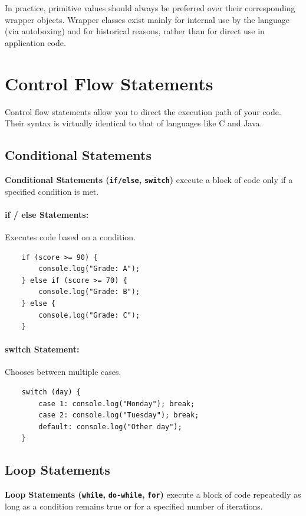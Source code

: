 \documentclass{scrbook}
\begin{document}
In practice, primitive values should always be preferred over their corresponding wrapper objects. Wrapper classes exist mainly for internal use by the language (via autoboxing) and for historical reasons, rather than for direct use in application code.

\section{Control Flow Statements}

Control flow statements allow you to direct the execution path of your code. Their syntax is virtually identical to that of languages like C and Java.

\subsection{Conditional Statements}

\textbf{Conditional Statements (}\texttt{\textbf{if/else}}\textbf{, } \texttt{\textbf{switch}}\textbf{)} execute a block of code only if a specified condition is met.

\paragraph{if / else Statements:} Executes code based on a condition.

\begin{lstlisting}
    if (score >= 90) {
        console.log("Grade: A");
    } else if (score >= 70) {
        console.log("Grade: B");
    } else {
        console.log("Grade: C");
    }
\end{lstlisting}

\paragraph{switch Statement:} Chooses between multiple cases.

\begin{lstlisting}
    switch (day) {
        case 1: console.log("Monday"); break;
        case 2: console.log("Tuesday"); break;
        default: console.log("Other day");
    }
\end{lstlisting}

\subsection{Loop Statements}

\textbf{Loop Statements (}\texttt{\textbf{while}}\textbf{, } \texttt{\textbf{do-while}}\textbf{, } \texttt{\textbf{for}}\textbf{)} execute a block of code repeatedly as long as a condition remains true or for a specified number of iterations.
\end{document}
